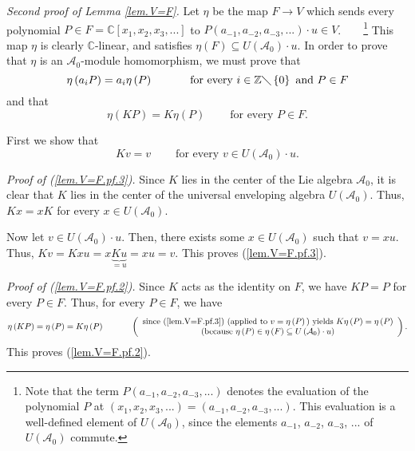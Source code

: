 \documentclass
[numbers=enddot,12pt,final,onecolumn,german,notitlepage]{scrartcl}%
\theoremstyle{definition}
\begin{document}
\textit{Second proof of Lemma \ref{lem.V=F}.} Let $\eta$ be the map
$F\rightarrow V$ which sends every polynomial $P\in F=\mathbb{C}\left[
x_{1},x_{2},x_{3},...\right]  $ to $P\left(  a_{-1},a_{-2},a_{-3},...\right)
\cdot u\in V$.\ \ \ \ \footnote{Note that the term $P\left(  a_{-1}%
,a_{-2},a_{-3},...\right)  $ denotes the evaluation of the polynomial $P$ at
$\left(  x_{1},x_{2},x_{3},...\right)  =\left(  a_{-1},a_{-2},a_{-3}%
,...\right)  $. This evaluation is a well-defined element of $U\left(
\mathcal{A}_{0}\right)  $, since the elements $a_{-1}$, $a_{-2}$, $a_{-3}$,
$...$ of $U\left(  \mathcal{A}_{0}\right)  $ commute.} This map $\eta$ is
clearly $\mathbb{C}$-linear, and satisfies $\eta\left(  F\right)  \subseteq
U\left(  \mathcal{A}_{0}\right)  \cdot u$. In order to prove that $\eta$ is an
$\mathcal{A}_{0}$-module homomorphism, we must prove that
\begin{equation}
\eta\left(  a_{i}P\right)  =a_{i}\eta\left(  P\right)
\ \ \ \ \ \ \ \ \ \ \text{for every }i\in\mathbb{Z}\diagdown\left\{
0\right\}  \text{ and }P\in F \label{lem.V=F.pf.1}%
\end{equation}
and that%
\begin{equation}
\eta\left(  KP\right)  =K\eta\left(  P\right)  \ \ \ \ \ \ \ \ \ \ \text{for
every }P\in F. \label{lem.V=F.pf.2}%
\end{equation}


First we show that%
\begin{equation}
Kv=v\ \ \ \ \ \ \ \ \ \ \text{for every }v\in U\left(  \mathcal{A}_{0}\right)
\cdot u. \label{lem.V=F.pf.3}%
\end{equation}


\textit{Proof of (\ref{lem.V=F.pf.3}).} Since $K$ lies in the center of the
Lie algebra $\mathcal{A}_{0}$, it is clear that $K$ lies in the center of the
universal enveloping algebra $U\left(  \mathcal{A}_{0}\right)  $. Thus,
$Kx=xK$ for every $x\in U\left(  \mathcal{A}_{0}\right)  $.

Now let $v\in U\left(  \mathcal{A}_{0}\right)  \cdot u$. Then, there exists
some $x\in U\left(  \mathcal{A}_{0}\right)  $ such that $v=xu$. Thus,
$Kv=Kxu=x\underbrace{Ku}_{=u}=xu=v$. This proves (\ref{lem.V=F.pf.3}).

\textit{Proof of (\ref{lem.V=F.pf.2}).} Since $K$ acts as the identity on $F$,
we have $KP=P$ for every $P\in F$. Thus, for every $P\in F$, we have%
\[
\eta\left(  KP\right)  =\eta\left(  P\right)  =K\eta\left(  P\right)
\ \ \ \ \ \ \ \ \ \ \left(
\begin{array}
[c]{c}%
\text{since (\ref{lem.V=F.pf.3}) (applied to }v=\eta\left(  P\right)  \text{)
yields }K\eta\left(  P\right)  =\eta\left(  P\right) \\
\text{(because }\eta\left(  P\right)  \in\eta\left(  F\right)  \subseteq
U\left(  \mathcal{A}_{0}\right)  \cdot u\text{)}%
\end{array}
\right)  .
\]
This proves (\ref{lem.V=F.pf.2}).
\end{document}
